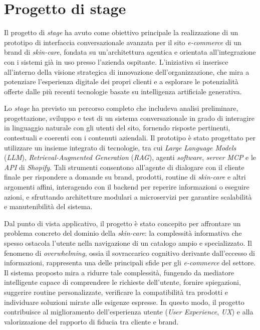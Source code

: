 \section{Progetto di stage}

Il progetto di \emph{stage} ha avuto come obiettivo principale la realizzazione di un prototipo di interfaccia conversazionale avanzata per il sito \emph{e-commerce} di un brand di \emph{skin-care},
fondata su un’architettura agentica e orientata all’integrazione con i sistemi già in uso presso l’azienda ospitante. 
L’iniziativa si inserisce all’interno della visione strategica di innovazione dell’organizzazione, che mira a potenziare l’esperienza digitale dei propri clienti e a 
esplorare le potenzialità offerte dalle più recenti tecnologie basate su intelligenza artificiale generativa.

Lo \emph{stage} ha previsto un percorso completo che includeva analisi preliminare, progettazione, sviluppo e test di un sistema conversazionale in grado di 
interagire in linguaggio naturale con gli utenti del sito, fornendo risposte pertinenti, contestuali e coerenti con i contenuti aziendali. Il prototipo è stato progettato 
per utilizzare un insieme integrato di tecnologie, tra cui \emph{Large Language Models} (\emph{LLM}), \emph{Retrieval-Augmented Generation} (\emph{RAG}), agenti \emph{software}, 
\emph{server} \emph{MCP} e le \emph{API} di \emph{Shopify}. Tali strumenti consentono all’agente di dialogare con il cliente finale per rispondere a domande su brand, prodotti, 
routine di \emph{skin-care} e altri argomenti affini, interagendo con il backend per reperire informazioni o eseguire azioni, e sfruttando architetture modulari a 
microservizi per garantire scalabilità e manutenibilità del sistema.

Dal punto di vista applicativo, il progetto è stato concepito per affrontare un problema concreto del dominio della \emph{skin-care}: la complessità informativa 
che spesso ostacola l’utente nella navigazione di un catalogo ampio e specializzato. Il fenomeno di \emph{overwhelming}, ossia il sovraccarico cognitivo derivante 
dall’eccesso di informazioni, rappresenta una delle principali sfide per gli \emph{e-commerce} del settore. Il sistema proposto mira a ridurre tale complessità, 
fungendo da mediatore intelligente capace di comprendere le richieste dell’utente, fornire spiegazioni, suggerire routine personalizzate, verificare la compatibilità 
tra prodotti e individuare soluzioni mirate alle esigenze espresse. In questo modo, il progetto contribuisce al miglioramento dell’esperienza utente (\emph{User Experience}, \emph{UX}) 
e alla valorizzazione del rapporto di fiducia tra cliente e brand.

